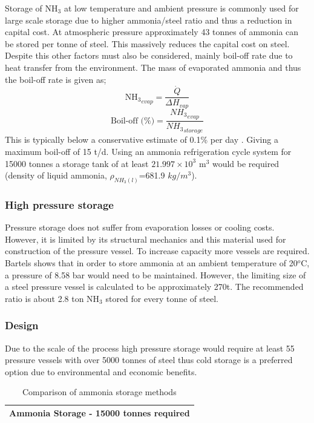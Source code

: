 \documentclass[11pt, a4paper]{article}
\begin{document}
{Storage of NH$_3$ at low temperature and ambient pressure is commonly used for large scale storage due to higher ammonia/steel ratio and thus a reduction in capital cost. At atmospheric pressure approximately 43 tonnes of ammonia can be stored per tonne of steel. This massively reduces the capital cost on steel. Despite this other factors must also be considered, mainly boil-off rate due to heat transfer from the environment. The mass of evaporated ammonia and thus the boil-off rate is given as;
\begin{equation}
{\text{NH}_3}_{evap} = \frac{\dot{Q}}{\Delta H_{vap}}
\end{equation}
\begin{equation}
\text{Boil-off (\%)} = \frac{{NH_3}_{evap} }{{NH_3}_{storage} }
\end{equation}
This is typically below a conservative estimate of 0.1\% per day \cite{Belapurkar2016}. Giving a maximum boil-off of 15 t/d. Using an ammonia refrigeration cycle system for 15000 tonnes a storage tank of at least $21.997\times10^3$ m$^3$ would be required (density of liquid ammonia, $\rho_{NH_3(l)}$=681.9 $kg/m^3$)\cite{Hacker2003}. 

\subsubsection{High pressure storage}

Pressure storage does not suffer from evaporation losses or cooling costs. However, it is limited by its structural mechanics and this material used for construction of the pressure vessel. To increase capacity more vessels are required. Bartels shows that in order to store ammonia at an ambient temperature of 20$^o$C, a pressure of 8.58 bar would need to be maintained. However, the limiting size of a steel pressure vessel is calculated to be approximately 270t. The recommended ratio is about 2.8 ton NH$_3$ stored for every tonne of steel. 

\subsubsection{Design}
Due to the scale of the process high pressure storage would require at least 55 pressure vessels with over 5000 tonnes of steel thus cold storage is a preferred option due to environmental and economic benefits. 

\begin{table}[!htbp]
	\begin{center}
		\caption{Comparison of ammonia storage methods}
		\begin{tabular}{ |p{5cm}||p{3cm}||p{3cm}|| }
			\hline
			\multicolumn{3}{|c|}{Ammonia Storage - 15000 tonnes required } \\
			\hline
			

\end{tabular}
\end{center}
\end{table}}
\end{document}
